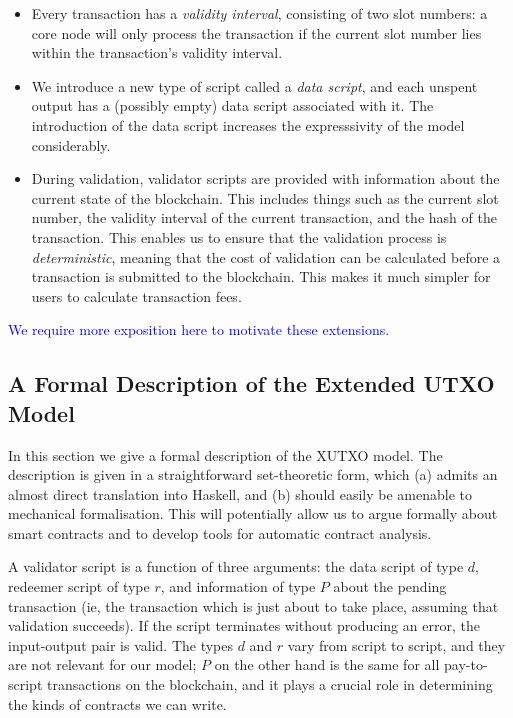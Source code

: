 \documentclass[a4paper]{article}
\newcommand{\blue}[1]{\textcolor{blue}{#1}}
\renewcommand{\i}{\textit}  %
\theoremstyle{definition}  %
\begin{document}
\begin{itemize}
\item Every transaction has a \textit{validity interval}, consisting
  of two slot numbers: a core node will only process the transaction
  if the current slot number lies within the transaction's validity
  interval.
\item We introduce a new type of script called a \i{data script},
  and each unspent output has a (possibly empty) data script
  associated with it.  The introduction of the data script
  increases the expresssivity of the model considerably.
\item During validation, validator scripts are provided with
  information about the current state of the blockchain.  This
  includes things such as the current slot number, the validity
  interval of the current transaction, and the hash of the
  transaction.  This enables us to ensure that the validation process
  is \i{deterministic}, meaning that the cost of validation can be
  calculated before a transaction is submitted to the blockchain.
  This makes it much simpler for users to calculate transaction fees.
\end{itemize}
  

\noindent\blue{We require more exposition here to motivate these extensions.}

\subsection{A Formal Description of the Extended UTXO Model}
\label{section:xutxo-spec}

In this section we give a formal description of the XUTXO model.  The
description is given in a straightforward set-theoretic form, which
(a) admits an almost direct translation into Haskell, and (b) should
easily be amenable to mechanical formalisation.  This will potentially
allow us to argue formally about smart contracts and to develop tools
for automatic contract analysis.

A validator script is a function of three arguments: the data script
of type $d$, redeemer script of type $r$, and information of type $P$
about the pending transaction (ie, the transaction which is
  just about to take place, assuming that validation succeeds).  If
the script terminates without producing an error, the input-output
pair is valid. The types $d$ and $r$ vary from script to script, and
they are not relevant for our model; $P$ on the other hand is the same
for all pay-to-script transactions on the blockchain, and it plays a
crucial role in determining the kinds of contracts we can write.
\end{document}
